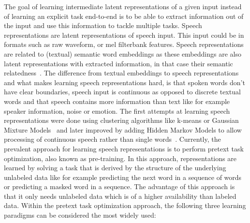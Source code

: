 The goal of learning intermediate latent representations of a given input instead of learning an explicit task end-to-end is to be able to extract information out of the input and use this information to tackle multiple tasks. Speech representations are latent representations of speech input. This input could be in formats such as raw waveform, or mel filterbank features. Speech representations are related to (textual) semantic word embeddings as these embeddings are also latent representations with extracted information, in that case their semantic relatedness~\cite{glove}. The difference from textual embeddings to speech representations and what makes learning speech representations hard, is that spoken words don't have clear boundaries, speech input is continuous as opposed to discrete textual words and that speech contains more information than text like for example speaker information, noise or emotion.
The first attempts at learning speech representations were done using clustering algorithms like k-means or Gaussian Mixture Models~\cite{clustering} and later improved by adding Hidden Markov Models to allow processing of continuous speech rather than single words~\cite{HMMs}. Currently, the prevalent approach for learning speech representations is to perform pretext task optimization, also known as pre-training. In this approach, representations are learned by solving a task that is derived by the structure of the underlying unlabeled data like for example predicting the next word in a sequence of words or predicting a masked word in a sequence. The advantage of this approach is that it only needs unlabeled data which is of a higher availability than labeled data. Within the pretext task optimization approach, the following three learning paradigms can be considered the most widely used:

